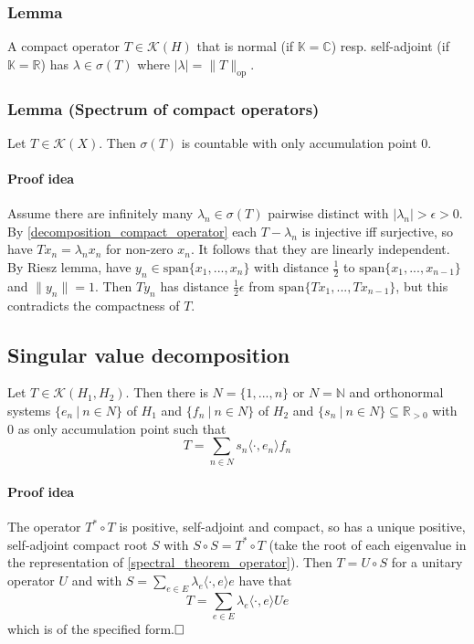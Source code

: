 \documentclass{scrartcl}
\newcommand{\R}{\mathbb{R}}
\newcommand{\N}{\mathbb{N}}
\newcommand{\C}{\mathbb{C}}
\begin{document}
\subsubsection{Lemma}
A compact operator $T \in \mathcal{K}(H)$ that is normal (if $\mathbb{K} = \C$) resp. self-adjoint (if $\mathbb{K} = \R$) has $\lambda \in \sigma(T)$ where $|\lambda| = \| T \|_{\mathrm{op}}$.

\subsubsection{Lemma (Spectrum of compact operators)}
Let $T \in \mathcal{K}(X)$. Then $\sigma(T)$ is countable with only accumulation point $0$.
\paragraph{Proof idea} Assume there are infinitely many $\lambda_n \in \sigma(T)$ pairwise distinct with $|\lambda_n| > \epsilon > 0$. By \ref{decomposition_compact_operator} each $T - \lambda_n$ is injective iff surjective, so have $Tx_n = \lambda_n x_n$ for non-zero $x_n$. 
It follows that they are linearly independent. By Riesz lemma, have $y_n \in \mathrm{span}\{x_1, ..., x_n\}$ with distance $\frac 1 2$ to $\mathrm{span}\{x_1, ..., x_{n - 1}\}$ and $\| y_n \| = 1$. Then $Ty_n$ has distance $\frac 1 2 \epsilon$ from $\mathrm{span}\{Tx_1, ..., Tx_{n-1}\}$, but this contradicts the compactness of $T$.

\subsection{Singular value decomposition}
Let $T \in \mathcal{K}(H_1, H_2)$. Then there is $N = \{ 1, ..., n \}$ or $N = \N$ and orthonormal systems $\{ e_n \ | \ n \in N \}$ of $H_1$ and $\{ f_n \ | \ n \in N \}$ of $H_2$ and $\{ s_n \ | \ n \in N \} \subseteq \R_{>0}$ with $0$ as only accumulation point such that
\begin{equation*}
    T = \sum_{n \in N} s_n \langle \cdot, e_n \rangle f_n
\end{equation*}
\paragraph{Proof idea} 
The operator $T^* \circ T$ is positive, self-adjoint and compact, so has a unique positive, self-adjoint compact root $S$ with $S \circ S = T^* \circ T$ (take the root of each eigenvalue in the representation of \ref{spectral_theorem_operator}).
Then $T = U \circ S$ for a unitary operator $U$ and with $S = \sum_{e \in E} \lambda_e \langle \cdot, e \rangle e$ have that
\begin{equation*}
    T = \sum_{e \in E} \lambda_e \langle \cdot, e \rangle Ue
\end{equation*}
which is of the specified form.$\hfill\square$
\end{document}
